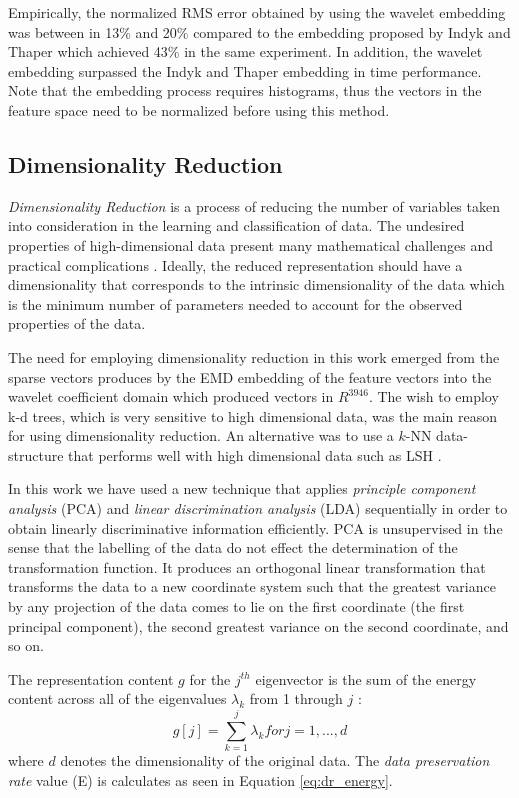 \documentclass[10pt, conference, compsocconf]{IEEEtran}
\theoremstyle{definition}
\begin{document}
Empirically, the normalized RMS error obtained by using the wavelet embedding was between in 13\% and 20\% compared to the embedding proposed by Indyk and Thaper which achieved 43\% in the same experiment. In addition, the wavelet embedding surpassed the Indyk and Thaper embedding in time performance. Note that the embedding process requires histograms, thus the vectors in the feature space need to be normalized before using this method.

\subsection{Dimensionality Reduction}
\label{subsec:dr}

\emph{Dimensionality Reduction} is a process of reducing the number of variables taken into consideration in the learning and classification of data. 
The undesired properties of high-dimensional data present many mathematical challenges and practical complications \cite{van2009dimensionality}. 
Ideally, the reduced representation should have a dimensionality that corresponds to the intrinsic dimensionality of the data \cite{van2009dimensionality} which is the minimum number of parameters needed to account for the observed properties of the data. 

The need for employing dimensionality reduction in this work emerged from the sparse vectors produces by the EMD embedding of the feature vectors into the wavelet coefficient domain which produced vectors in $R^{3946}$. 
The wish to employ k-d trees, which is very sensitive to high dimensional data, was the main reason for using dimensionality reduction. 
An alternative was to use a $k$-NN data-structure that performs well with high dimensional data such as LSH \cite{gionis1999similarity}. 

In this work we have used a new technique that applies \emph{principle component analysis} (PCA) and \emph{linear discrimination analysis} (LDA) sequentially in order to obtain linearly discriminative information efficiently.
PCA is unsupervised in the sense that the labelling of the data do not effect the determination of the transformation function. 
It produces an orthogonal linear transformation that transforms the data to a new coordinate system such that the greatest variance by any projection of the data comes to lie on the first coordinate (the first principal component), the second greatest variance on the second coordinate, and so on.

The representation content $g$ for the $j^{th}$ eigenvector is the sum of the energy content across all of the eigenvalues $\lambda_k$ from 1 through $j$ :
\begin{equation}
g[j]=\sum_{k=1}^{j}\lambda_k  for  j=1,...,d
\end{equation}
where $d$ denotes the dimensionality of the original data. The \emph{data preservation rate} value (E) is calculates as seen in Equation \ref{eq:dr_energy}. 
\end{document}
